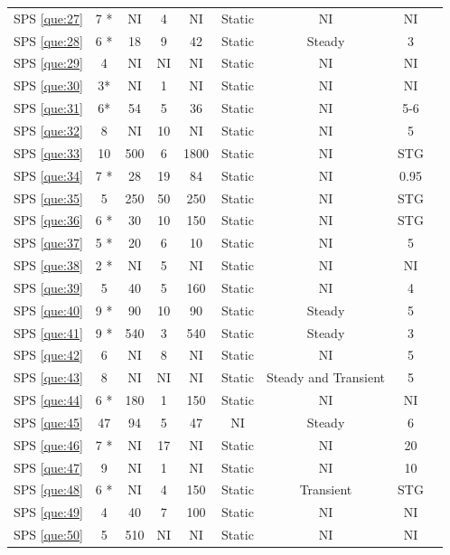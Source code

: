 \documentclass[sensors,review,accept,moreauthors,pdftex]{Definitions/mdpi}
\begin{document}
\begin{table}[H]
\begin{tabular}{ccccccccc}
	SPS \ref{que:27}	&	7 *	&	NI	&	4	&	NI	&	Static	&	NI	&	NI	\\	
	SPS \ref{que:28}	&	6 *	&	18	&	9	&	42	&	Static	&	Steady	&	3	\\	
	SPS \ref{que:29}	&	4	&	NI	&	NI	&	NI	&	Static	&	NI	&	NI	\\	
	SPS \ref{que:30}	&	3*	&	NI	&	1	&	NI	&	Static	&	NI	&	NI	\\	
	SPS \ref{que:31}	&	6*	&	54	&	5	&	36	&	Static	&	NI	&	5-6	\\	
	SPS \ref{que:32}	&	8	&	NI	&	10	&	NI	&	Static	&	NI	&	5	\\	
	SPS \ref{que:33}	&	10	&	500	&	6	&	1800	&	Static	&	NI	&	STG	\\	
	SPS \ref{que:34}	&	7 *	&	28	&	19	&	84	&	Static	&	NI	&	0.95	\\	
	SPS \ref{que:35}	&	5	&	250	&	50	&	250	&	Static	&	NI	&	STG	\\	
	SPS \ref{que:36}	&	6 *	&	30	&	10	&	150	&	Static	&	NI	&	STG	\\	
	SPS \ref{que:37}	&	5 *	&	20	&	6	&	10	&	Static	&	NI	&	5	\\	
	SPS \ref{que:38}	&	2 *	&	NI	&	5	&	NI	&	Static	&	NI	&	NI	\\	
	SPS \ref{que:39}	&	5	&	40	&	5	&	160	&	Static	&	NI	&	4	\\	
	SPS \ref{que:40}	&	9 *	&	90	&	10	&	90	&	Static	&	Steady	&	5	\\	
	SPS \ref{que:41}	&	9 *	&	540	&	3	&	540	&	Static	&	Steady	&	3	\\	
	SPS \ref{que:42}	&	6	&	NI	&	8	&	NI	&	Static	&	NI	&	5	\\	
	SPS \ref{que:43}	&	8	&	NI	&	NI	&	NI	&	Static	&	Steady and Transient	&	5	\\	
	SPS \ref{que:44}	&	6 *	&	180	&	1	&	150	&	Static	&	NI	&	NI	\\	
	SPS \ref{que:45}	&	47	&	94	&	5	&	47	&	NI	&	Steady	&	6	\\	
	SPS \ref{que:46}	&	7 *	&	NI	&	17	&	NI	&	Static	&	NI	&	20	\\	
	SPS \ref{que:47}	&	9	&	NI	&	1	&	NI	&	Static	&	NI	&	10	\\	
	SPS \ref{que:48}	&	6 *	&	NI	&	4	&	150	&	Static	&	Transient	&	STG	\\	
	SPS \ref{que:49}	&	4	&	40	&	7	&	100	&	Static	&	NI	&	NI	\\	
	SPS \ref{que:50}	&	5	&	510	&	NI	&	NI	&	Static	&	NI	&	NI	\\	
		\bottomrule
		\end{tabular}
\end{table}
\end{document}
